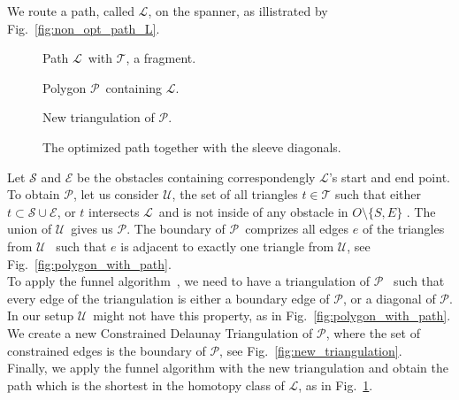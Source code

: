 \documentclass{gd-llncs}
\newcommand{\cdt}{$\mathcal{T}$}
\newcommand{\unpath}{$\mathcal{L}$}
\newcommand{\triset}{$\mathcal{U}$}
\newcommand{\plg}{$\mathcal{P}$}
\begin{document}
{We route a path, called \unpath, on the spanner, as illistrated by Fig.~\ref{fig:non_opt_path_L}.
\begin{figure}[!tbp]
  \centering
  \begin{minipage}[b]{0.45\textwidth}
    
    \caption{Path \unpath~with \cdt, a fragment.}
    \label{fig:non_opt_path_L}
  \end{minipage}
  \hfill
  \begin{minipage}[b]{0.45\textwidth}
    
    \caption{Polygon \plg~containing \unpath.}
    \label{fig:polygon_with_path}
  \end{minipage}
  \vfill
  \begin{minipage}[b]{0.45\textwidth}
    
    \caption{New triangulation of \plg.}
    \label{fig:new_triangulation}
  \end{minipage}
  \hfill
  \begin{minipage}[b]{0.45\textwidth}
    
    \caption{The optimized path together with the sleeve diagonals.}
    \label{fig:optimized_path}
  \end{minipage}
\end{figure}
Let $\mathcal{S}$ and $\mathcal{E}$ be the obstacles containing correspondengly \unpath's start and end point.
To obtain \plg, let us consider \triset, the set of all triangles ${t} \in \mathcal{T}$ such that
either ${t} \subset \mathcal{S} \cup \mathcal{E}$, or $t$ intersects \unpath~and is not inside of any obstacle in $O \setminus \{S,E\}$  .
The union of \triset~gives us \plg. The boundary of \plg~comprizes all edges $e$ of the triangles from \triset~ such that $e$ is adjacent to exactly one triangle from \triset, see Fig.~\ref{fig:polygon_with_path}. \\
To apply the funnel algorithm~\cite{chazelle1982theorem,hershberger1994computing}, we need to have a triangulation of \plg~ such that every edge of the triangulation is either a boundary edge of \plg, or a diagonal of \plg. In our setup \triset~might not have this property, as in Fig.~\ref{fig:polygon_with_path}. We create a new Constrained Delaunay Triangulation of \plg, where the set of constrained edges is the boundary of \plg, see Fig.~\ref{fig:new_triangulation}.\\
Finally, we apply the funnel algorithm with the new triangulation and obtain the path which is the shortest in the homotopy class of \unpath, as in Fig.~\ref{fig:optimized_path}.\\
}
\end{document}
